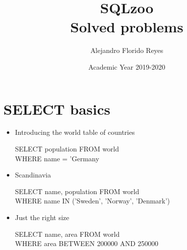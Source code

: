 \documentclass[10pt, oneside]{article}
\title{SQLzoo\\ Solved problems}
\author{Alejandro Florido Reyes}
\date{Academic Year 2019-2020}
\begin{document}
\maketitle
\tableofcontents

\vspace{.25in}

\section{SELECT basics}
\begin{itemize}
	\item Introducing the world table of countries
	
	\begin{center}
		\begin{minipage}{.4\linewidth}
			SELECT population FROM world\\
			WHERE name = 'Germany
		\end{minipage}
	\end{center}

	\item Scandinavia
	
	\begin{center}
		\begin{minipage}{.6\linewidth}
			SELECT name, population FROM world\\
			WHERE name IN ('Sweden', 'Norway', 'Denmark')
		\end{minipage}
	\end{center}
	
	\item Just the right size
	
	\begin{center}
		\begin{minipage}{.6\linewidth}
			SELECT name, area FROM world \\
			WHERE area BETWEEN 200000 AND 250000
		\end{minipage}
	\end{center}
	
\end{itemize}
\end{document}
